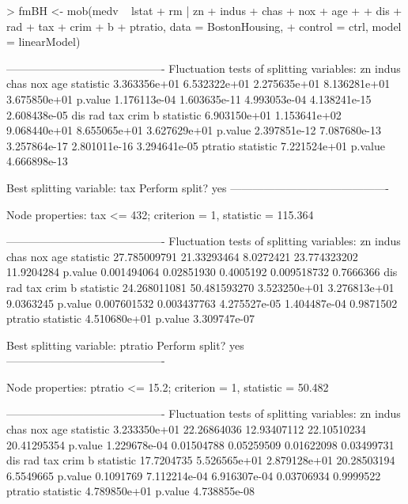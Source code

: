 \documentclass{Z}
\begin{document}
\begin{Schunk}
\begin{Sinput}
> fmBH <- mob(medv ~ lstat + rm | zn + indus + chas + nox + age + 
+     dis + rad + tax + crim + b + ptratio, data = BostonHousing, 
+     control = ctrl, model = linearModel)
\end{Sinput}
\begin{Soutput}
-------------------------------------------
Fluctuation tests of splitting variables:
                    zn        indus         chas          nox          age
statistic 3.363356e+01 6.532322e+01 2.275635e+01 8.136281e+01 3.675850e+01
p.value   1.176113e-04 1.603635e-11 4.993053e-04 4.138241e-15 2.608438e-05
                   dis          rad          tax         crim            b
statistic 6.903150e+01 1.153641e+02 9.068440e+01 8.655065e+01 3.627629e+01
p.value   2.397851e-12 7.087680e-13 3.257864e-17 2.801011e-16 3.294641e-05
               ptratio
statistic 7.221524e+01
p.value   4.666898e-13

Best splitting variable: tax
Perform split? yes
-------------------------------------------

Node properties:
tax <= 432; criterion = 1, statistic = 115.364

-------------------------------------------
Fluctuation tests of splitting variables:
                    zn       indus      chas          nox        age
statistic 27.785009791 21.33293464 8.0272421 23.774323202 11.9204284
p.value    0.001494064  0.02851930 0.4005192  0.009518732  0.7666366
                   dis          rad          tax         crim         b
statistic 24.268011081 50.481593270 3.523250e+01 3.276813e+01 9.0363245
p.value    0.007601532  0.003437763 4.275527e-05 1.404487e-04 0.9871502
               ptratio
statistic 4.510680e+01
p.value   3.309747e-07

Best splitting variable: ptratio
Perform split? yes
-------------------------------------------

Node properties:
ptratio <= 15.2; criterion = 1, statistic = 50.482

-------------------------------------------
Fluctuation tests of splitting variables:
                    zn       indus        chas         nox         age
statistic 3.233350e+01 22.26864036 12.93407112 22.10510234 20.41295354
p.value   1.229678e-04  0.01504788  0.05259509  0.01622098  0.03499731
                 dis          rad          tax        crim         b
statistic 17.7204735 5.526565e+01 2.879128e+01 20.28503194 6.5549665
p.value    0.1091769 7.112214e-04 6.916307e-04  0.03706934 0.9999522
               ptratio
statistic 4.789850e+01
p.value   4.738855e-08


\end{Soutput}
\end{Schunk}
\end{document}
